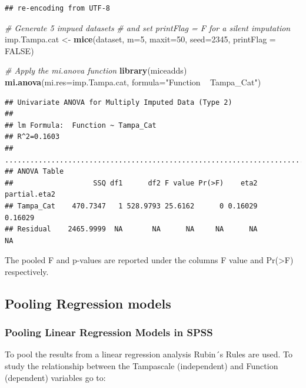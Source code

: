 \documentclass[
]{book}
\newenvironment{Shaded}{\begin{snugshade}}{\end{snugshade}}
\newcommand{\CommentTok}[1]{\textcolor[rgb]{0.56,0.35,0.01}{\textit{#1}}}
\newcommand{\DataTypeTok}[1]{\textcolor[rgb]{0.13,0.29,0.53}{#1}}
\newcommand{\DecValTok}[1]{\textcolor[rgb]{0.00,0.00,0.81}{#1}}
\newcommand{\KeywordTok}[1]{\textcolor[rgb]{0.13,0.29,0.53}{\textbf{#1}}}
\newcommand{\NormalTok}[1]{#1}
\newcommand{\OtherTok}[1]{\textcolor[rgb]{0.56,0.35,0.01}{#1}}
\newcommand{\StringTok}[1]{\textcolor[rgb]{0.31,0.60,0.02}{#1}}
\begin{document}
\begin{verbatim}
## re-encoding from UTF-8
\end{verbatim}

\begin{Shaded}
\begin{Highlighting}[]
\CommentTok{# Generate 5 impued datasets }
\CommentTok{# and set printFlag = F for a silent imputation}
\NormalTok{imp.Tampa.cat <-}\StringTok{ }\KeywordTok{mice}\NormalTok{(dataset, }\DataTypeTok{m=}\DecValTok{5}\NormalTok{, }\DataTypeTok{maxit=}\DecValTok{50}\NormalTok{, }\DataTypeTok{seed=}\DecValTok{2345}\NormalTok{, }\DataTypeTok{printFlag =} \OtherTok{FALSE}\NormalTok{)}

\CommentTok{# Apply the mi.anova function}
\KeywordTok{library}\NormalTok{(miceadds)}
\KeywordTok{mi.anova}\NormalTok{(}\DataTypeTok{mi.res=}\NormalTok{imp.Tampa.cat, }\DataTypeTok{formula=}\StringTok{"Function ~ Tampa_Cat"}\NormalTok{)}
\end{Highlighting}
\end{Shaded}

\begin{verbatim}
## Univariate ANOVA for Multiply Imputed Data (Type 2)  
## 
## lm Formula:  Function ~ Tampa_Cat
## R^2=0.1603 
## ..........................................................................
## ANOVA Table 
##                   SSQ df1      df2 F value Pr(>F)    eta2 partial.eta2
## Tampa_Cat    470.7347   1 528.9793 25.6162      0 0.16029      0.16029
## Residual    2465.9999  NA       NA      NA     NA      NA           NA
\end{verbatim}

The pooled F and p-values are reported under the columns F value and Pr(\textgreater F) respectively.

\hypertarget{pooling-regression-models}{%
\subsection{Pooling Regression models}\label{pooling-regression-models}}

\hypertarget{pooling-linear-regression-models-in-spss}{%
\subsubsection{Pooling Linear Regression Models in SPSS}\label{pooling-linear-regression-models-in-spss}}

To pool the results from a linear regression analysis Rubin´s Rules are used. To study the relationship between the Tampascale (independent) and Function (dependent) variables go to:
\end{document}
